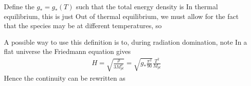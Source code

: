 \documentclass{article}
\begin{document}
\begin{definition}\label{def:CSM:1}
Define the  $g_\ast = g_\ast(T)$ such that the total energy density is
In thermal equilibrium, this is just
Out of thermal equilibrium, we must allow for the fact that the species may be at different temperatures, so 
\end{definition}

\begin{example}
A possible way to use this definition is to, during radiation domination, note 
In a flat universe the Friedmann equation gives 
\begin{align}\label{eq:CSM:5}
H = \sqrt{\frac{\rho}{3 M_{pl}^2}} = \sqrt{g_\ast \frac{\pi^2}{90} } \frac{T^2}{M_{pl}}
\end{align}
Hence the continuity can be rewritten as 
\end{example}
\end{document}
